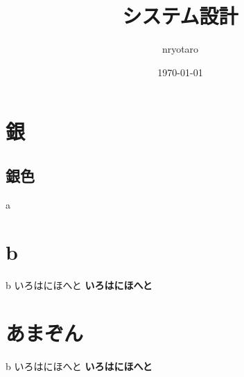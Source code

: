\documentclass{jlreq}
\begin{document}
\title{システム設計}
\author{nryotaro}
\date{\today}
\maketitle
\tableofcontents
\section{銀}
\subsection{銀色}
\begin{refsection}
  a
\cite{lc-sys}
\printbibliography[title=参考文献]
\end{refsection}

\section{b}
\begin{refsection}
b
いろはにほへと\cite{lc-high}
\textbf{いろはにほへと}
\printbibliography[title=参考文献]
\end{refsection}
\section{あまぞん}
\begin{refsection}
b
いろはにほへと\cite{lc-high}
\textbf{いろはにほへと}\cite{lc-sys}
\printbibliography[title=参考文献]
\end{refsection}
\end{document}
